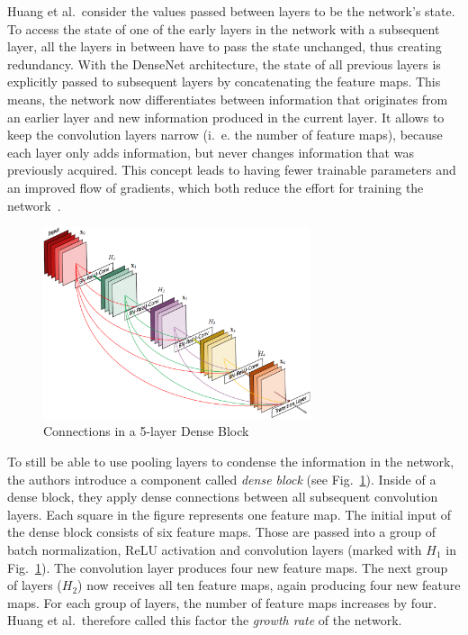 Huang et al.\ consider the values passed between layers to be the network's state. To access the state of one of the early layers in the network with a subsequent layer, all the layers in between have to pass the state unchanged, thus creating redundancy. With the DenseNet architecture, the state of all previous layers is explicitly passed to subsequent layers by concatenating the feature maps. This means, the network now differentiates between information that originates from an earlier layer and new information produced in the current layer. It allows to keep the convolution layers narrow (i.~e. the number of feature maps), because each layer only adds information, but never changes information that was previously acquired. This concept leads to having fewer trainable parameters and an improved flow of gradients, which both reduce the effort for training the network~\cite{densenet18}.

\begin{figure}[h]
    \centering
    \includegraphics[width=0.7\textwidth]{images/dense-net-architecture}
    \caption[Connections in a 5-layer Dense Block]{Connections in a 5-layer Dense Block~\cite{densenet18}}
    \label{fig:dense_block}
\end{figure}

To still be able to use pooling layers to condense the information in the network, the authors introduce a component called \emph{dense block} (see Fig.~\ref{fig:dense_block}). Inside of a dense block, they apply dense connections between all subsequent convolution layers. Each square in the figure represents one feature map. The initial input of the dense block consists of six feature maps. Those are passed into a group of batch normalization, ReLU activation and convolution layers (marked with $H_1$ in Fig.~\ref{fig:dense_block}). The convolution layer produces four new feature maps. The next group of layers ($H_2$) now receives all ten feature maps, again producing four new feature maps. For each group of layers, the number of feature maps increases by four. Huang et al.\ therefore called this factor the \emph{growth rate} of the network.

